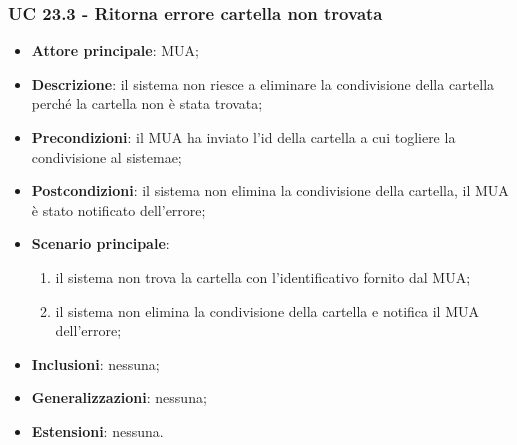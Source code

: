 \subsubsection{UC 23.3 - Ritorna errore cartella non trovata} \label{sec:UC23.3}
    \begin{itemize}
        \item \textbf{Attore principale}: MUA;
        \item \textbf{Descrizione}: il sistema non riesce a eliminare la condivisione della cartella perché la cartella non è stata trovata;
        \item \textbf{Precondizioni}: il MUA ha inviato l'id della cartella a cui togliere la condivisione al sistemae;
        \item \textbf{Postcondizioni}: il sistema non elimina la condivisione della cartella, il MUA è stato notificato dell'errore;
        \item \textbf{Scenario principale}:
            \begin{enumerate}
                \item il sistema non trova la cartella con l'identificativo fornito dal MUA;
                \item il sistema non elimina la condivisione della cartella e notifica il MUA dell'errore;
            \end{enumerate}
        \item \textbf{Inclusioni}: nessuna;
        \item \textbf{Generalizzazioni}: nessuna;
        \item \textbf{Estensioni}: nessuna.
    \end{itemize}

